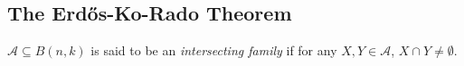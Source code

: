 \begin{comment}
\begin{flem}
	Consider the matrix $X$ over $\F$, with rows indexed by $S$ and columns indexed by $T$, such that $X_{st} = x_{st}$ if $st \in E$ and $0$ otherwise. Then, $\rank(X)$ is equal to the size of a maximum matching in $G$. 
\end{flem}
\begin{proof}
	Let $M = (A,B,f)$ be a largest matching in $G$ of size $k$. Consider the $k \times k$ submatrix $Y$ of $X$, with rows indexed by $A$ and columns indexed by $B$. Note that
	\[ \det(Y) = \sum_{\substack{\pi : A \to B \\ \pi \text{ bijection}}} \sign(\pi) \prod_{s \in A} X_{s \pi(s)} \ne 0, \]
	because $f$ is a bijection for which the corresponding term is nonzero. Therefore, $\rank(X) \ge k$.\\
	On the other hand, let $\rank(X) = r$ and suppose there is a $r \times r$ submatrix $Y$ of $X$ with nonzero determinant, with rows indexed by $A$ and columns indexed by $B$. Then, by the definition of the determinant, there is a bijection $\pi : A \to B$ such that $s \pi(s) \in E$ for all $s \in A$. Therefore, there is a matching of size at least $\rank(X)$.
\end{proof}

\begin{flem}
	Consider the same matrix $X$ as in the previous lemma. Then, $\rank(X)$ is equal to the size of a smallest cover of $G$.
\end{flem}
\begin{proof}
	Suppose that $X$ is such that there is some row that is not linearly dependent on the remaining rows. Removing this row, we obtain a matrix $X_1$. Keep repeating this procedure until a matrix $X_s$ is obtained, such that every row of $X_s$ is linearly dependent on the other rows. Now perform the same procedure on the columns, until the matrix $X_{s+t}$ is obtained. Then, $\rank(X) = s+t+\rank(X_{s+t})$. Set $(J,K)$ to be the sets indexing the removed rows and columns. It is also easy to see that $X_{s+t}$ is the all zeros matrix -- 
\end{proof}

\end{comment}

\subsection{The Erd\H{o}s-Ko-Rado Theorem}

\begin{fdef}
	$\mathcal{A} \subseteq B(n,k)$ is said to be an \emph{intersecting family} if for any $X,Y \in \mathcal{A}$, $X \cap Y \ne \emptyset$.
\end{fdef}

